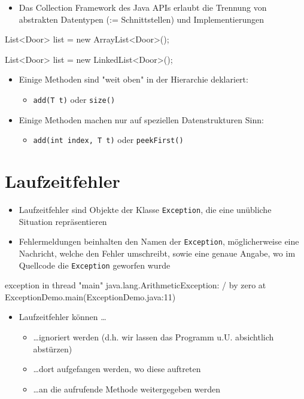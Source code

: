 \documentclass[a4paper,10pt, dvipsnames]{report}
\newcommand{\javaInLine}[1]{\texttt{#1}}
\begin{document}
\begin{itemize}
	\item Das Collection Framework des Java APIs erlaubt die Trennung von abstrakten Datentypen (:= Schnittstellen) und Implementierungen
\end{itemize}

\begin{javacodebox}
List<Door> list = new ArrayList<Door>();

List<Door> list = new LinkedList<Door>();
\end{javacodebox}

\begin{itemize}
	\item Einige Methoden sind "weit oben" in der Hierarchie deklariert:
	\begin{itemize}
        \item \javaInLine{add(T t)} oder \javaInLine{size()}
    \end{itemize}
    \item Einige Methoden machen nur auf speziellen Datenstrukturen Sinn:
    \begin{itemize}
        \item \javaInLine{add(int index, T t)} oder \javaInLine{peekFirst()}
    \end{itemize}
\end{itemize}


\section{Laufzeitfehler}

\begin{itemize}
	\item Laufzeitfehler sind Objekte der Klasse \javaInLine{Exception}, die eine unübliche Situation repräsentieren
	\item Fehlermeldungen beinhalten den Namen der \javaInLine{Exception}, möglicherweise eine Nachricht, welche den Fehler umschreibt, sowie eine genaue Angabe, wo im Quellcode die \javaInLine{Exception} geworfen wurde
\end{itemize}

\begin{textcodebox}
exception in thread "main"
java.lang.ArithmeticException: / by zero at
ExceptionDemo.main(ExceptionDemo.java:11)
\end{textcodebox}


\begin{itemize}
	\item Laufzeitfehler können \ldots
	\begin{itemize}
        \item \ldots ignoriert werden (d.h. wir lassen das Programm u.U. absichtlich abstürzen)
        \item \ldots dort aufgefangen werden, wo diese auftreten
        \item \ldots an die aufrufende Methode weitergegeben werden
    \end{itemize}
\end{itemize}
\end{document}
